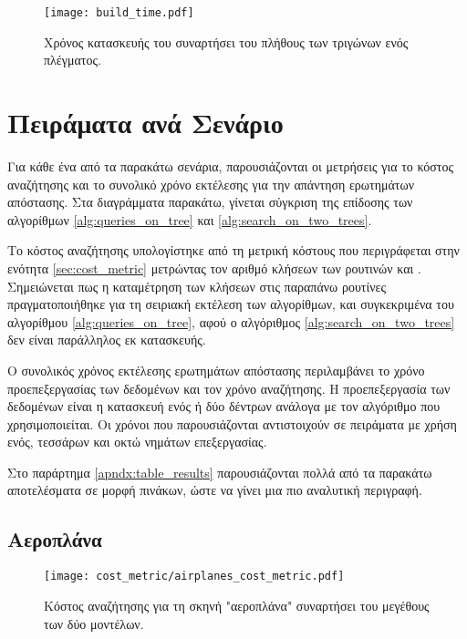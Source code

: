\begin{figure}[h]
    \centering
    \texttt{[image: build\_time.pdf]}
    \caption[Χρόνοι Κατασκευής του ]{
        Χρόνος κατασκευής του  συναρτήσει 
        του πλήθους των τριγώνων ενός πλέγματος.
    }
    \label{fig:build_time}
\end{figure}

\section{Πειράματα ανά Σενάριο}
Για κάθε ένα από τα παρακάτω σενάρια, παρουσιάζονται οι 
μετρήσεις για το κόστος αναζήτησης και το συνολικό χρόνο 
εκτέλεσης για την απάντηση ερωτημάτων απόστασης.
Στα διαγράμματα παρακάτω, γίνεται σύγκριση της επίδοσης των αλγορίθμων 
\ref{alg:queries_on_tree} και \ref{alg:search_on_two_trees}.

Το κόστος αναζήτησης υπολογίστηκε από τη μετρική κόστους 
που περιγράφεται στην ενότητα \ref{sec:cost_metric} 
μετρώντας τον αριθμό κλήσεων των ρουτινών 
 και .
Σημειώνεται πως η καταμέτρηση των κλήσεων στις παραπάνω ρουτίνες 
πραγματοποιήθηκε για τη σειριακή εκτέλεση των αλγορίθμων, και συγκεκριμένα 
του αλγορίθμου \ref{alg:queries_on_tree}, αφού ο αλγόριθμος 
\ref{alg:search_on_two_trees} δεν είναι παράλληλος εκ κατασκευής.

Ο συνολικός χρόνος εκτέλεσης ερωτημάτων απόστασης περιλαμβάνει 
το χρόνο προεπεξεργασίας των δεδομένων και τον χρόνο αναζήτησης.
Η προεπεξεργασία των δεδομένων είναι η κατασκευή ενός ή δύο δέντρων 
ανάλογα με τον αλγόριθμο που χρησιμοποιείται.
Οι χρόνοι που παρουσιάζονται αντιστοιχούν σε πειράματα με χρήση 
ενός, τεσσάρων και οκτώ νημάτων επεξεργασίας.

Στο παράρτημα \ref{apndx:table_results} παρουσιάζονται πολλά από 
τα παρακάτω αποτελέσματα σε μορφή πινάκων, ώστε να γίνει μια πιο 
αναλυτική περιγραφή.

\subsection{Αεροπλάνα}

\begin{figure}[H]
    \centering
    \texttt{[image: cost\_metric/airplanes\_cost\_metric.pdf]}
    \caption[Κόστος Αναζήτησης για "αεροπλάνα"] {
        Κόστος αναζήτησης για τη σκηνή "αεροπλάνα" συναρτήσει 
        του μεγέθους των δύο μοντέλων.
    }
\end{figure}

